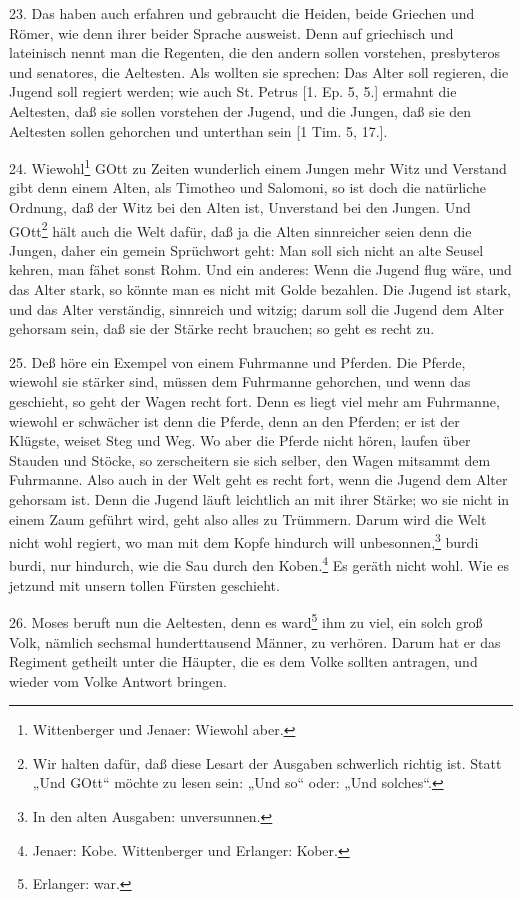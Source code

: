 23. Das haben auch erfahren und gebraucht die Heiden, beide Griechen und Römer, wie denn
ihrer beider Sprache ausweist. Denn auf griechisch und lateinisch nennt man die Regenten, die den andern sollen vorstehen, presbyteros und senatores, die Aeltesten. Als wollten sie sprechen: Das Alter soll regieren, die Jugend soll regiert werden; wie auch St. Petrus [1. Ep. 5, 5.] ermahnt die Aeltesten, daß sie sollen vorstehen der Jugend, und die Jungen, daß sie den Aeltesten sollen gehorchen und unterthan sein [1 Tim. 5, 17.].

24. Wiewohl\footnote{Wittenberger und Jenaer: Wiewohl aber.} GOtt zu Zeiten wunderlich einem Jungen mehr Witz und Verstand gibt denn einem Alten, als Timotheo und Salomoni, so ist doch die natürliche Ordnung, daß der Witz bei den Alten ist, Unverstand bei den Jungen. Und GOtt\footnote{Wir halten dafür, daß diese Lesart der Ausgaben schwerlich richtig ist. Statt „Und GOtt“ möchte zu lesen sein: „Und so“ oder: „Und solches“.} hält auch die Welt dafür, daß ja die Alten sinnreicher seien denn die Jungen, daher ein gemein Sprüchwort geht: Man soll sich nicht an alte Seusel kehren, man fähet sonst Rohm. Und ein anderes: Wenn die Jugend flug wäre, und das Alter stark, so könnte man es nicht mit Golde bezahlen. Die Jugend ist stark, und das Alter verständig, sinnreich und witzig; darum soll die Jugend dem Alter gehorsam sein, daß sie der Stärke recht brauchen; so geht es recht zu.

25. Deß höre ein Exempel von einem Fuhrmanne und Pferden. Die Pferde, wiewohl sie stärker sind, müssen dem Fuhrmanne gehorchen, und wenn das geschieht, so geht der Wagen recht fort. Denn es liegt viel mehr am Fuhrmanne, wiewohl er schwächer ist denn die Pferde, denn an den Pferden; er ist der Klügste, weiset Steg und Weg. Wo aber die Pferde nicht hören, laufen über Stauden und Stöcke, so zerscheitern sie sich selber, den Wagen mitsammt dem Fuhrmanne. Also auch in der Welt geht es recht fort, wenn die Jugend dem Alter gehorsam ist. Denn die Jugend läuft leichtlich an mit ihrer Stärke; wo sie nicht in einem Zaum geführt wird, geht also alles zu Trümmern. Darum wird die Welt nicht wohl regiert, wo man mit dem Kopfe hindurch will unbesonnen,\footnote{In den alten Ausgaben: unversunnen.} burdi burdi, nur hindurch, wie die Sau durch den Koben.\footnote{Jenaer: Kobe. Wittenberger und Erlanger: Kober.} Es geräth nicht wohl. Wie es jetzund mit unsern tollen Fürsten geschieht.

26. Moses beruft nun die Aeltesten, denn es ward\footnote{Erlanger: war.} ihm zu viel, ein solch groß Volk, nämlich sechsmal hunderttausend Männer, zu verhören. Darum hat er das Regiment getheilt unter die Häupter, die es dem Volke sollten antragen, und wieder vom Volke Antwort bringen.


